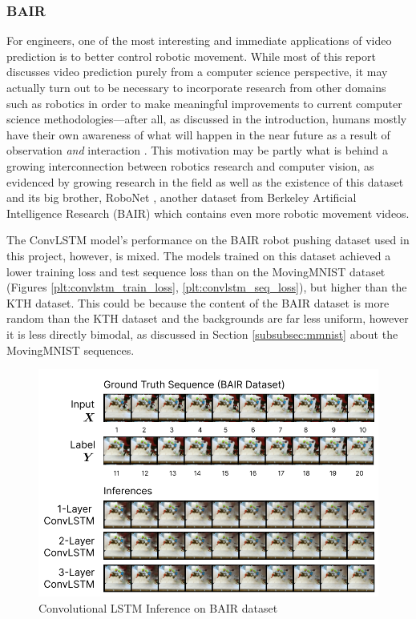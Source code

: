 \documentclass{scrartcl}
\begin{document}
\subsubsection{BAIR}
\label{subsubsec:bair}

For engineers, one of the most interesting and immediate applications of video
prediction is to better control robotic movement. While most of this report
discusses video prediction purely from a computer science perspective, it may
actually turn out to be necessary to incorporate research from other domains
such as robotics in order to make meaningful improvements to current computer
science methodologies---after all, as discussed in the introduction, humans
mostly have their own awareness of what will happen in the near future as a
result of observation \textit{and} interaction \cite{human_learning_sequences}.
This motivation may be partly what is behind a growing interconnection between
robotics research and computer vision, as evidenced by growing research in the
field as well as the existence of this dataset and its big brother, RoboNet
\cite{robonet_dataset}, another dataset from Berkeley Artificial Intelligence
Research (BAIR) which contains even more robotic movement videos.

The ConvLSTM model's performance on the BAIR robot pushing dataset used in this
project, however, is mixed. The models trained on this dataset achieved a lower
training loss and test sequence loss than on the MovingMNIST dataset (Figures
\ref{plt:convlstm_train_loss}, \ref{plt:convlstm_seq_loss}), but higher than the KTH
dataset. This could be because the content of the BAIR dataset is more random
than the KTH dataset and the backgrounds are far less uniform, however it is
less directly bimodal, as discussed in Section \ref{subsubsec:mmnist} about the
MovingMNIST sequences.

\begin{figure}[H]
	\begin{center}
		\includegraphics[width=1\textwidth]{inferences/bair/bair_inferences.png}
	\end{center}
	\caption{Convolutional LSTM Inference on BAIR dataset}
	\label{inf:convlstm_bair_inference}
\end{figure}
\end{document}
